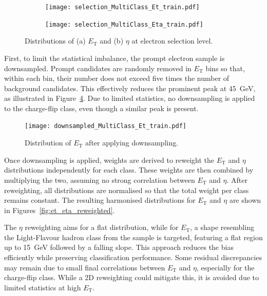 \begin{figure}[htbp]
  \centering
  \begin{subfigure}[b]{0.49\textwidth}
      \centering
      \texttt{[image: selection\_MultiClass\_Et\_train.pdf]}
      \caption{}
      \label{fig:et_selection}
  \end{subfigure}
  \hfill
  \begin{subfigure}[b]{0.49\textwidth}
      \centering
      \texttt{[image: selection\_MultiClass\_Eta\_train.pdf]}
      \caption{}
      \label{fig:eta_selection}
  \end{subfigure}
  \caption{Distributions of (a) $E_{\text{T}}$ and (b) $\eta$ at electron selection level.}
  \label{fig:et_eta_selection}
\end{figure}

First, to limit the statistical imbalance, the prompt electron sample is downsampled. Prompt candidates are randomly removed in $E_{\text{T}}$ bins so that, within each bin, their number does not exceed five times the number of background candidates. This effectively reduces the prominent peak at 45~GeV, as illustrated in Figure~\ref{fig:et_downsampled}. Due to limited statistics, no downsampling is applied to the charge-flip class, even though a similar peak is present.

\begin{figure}[htbp]
  \centering
  \texttt{[image: downsampled\_MultiClass\_Et\_train.pdf]}
  \caption{Distribution of $E_{\text{T}}$ after applying downsampling.}
  \label{fig:et_downsampled}
\end{figure}

Once downsampling is applied, weights are derived to reweight the $E_{\text{T}}$ and $\eta$ distributions independently for each class. These weights are then combined by multiplying the two, assuming no strong correlation between $E_{\text{T}}$ and $\eta$. After reweighting, all distributions are normalised so that the total weight per class remains constant. The resulting harmonised distributions for $E_{\text{T}}$ and $\eta$ are shown in Figures~\ref{fig:et_eta_reweighted}.

The $\eta$ reweighting aims for a flat distribution, while for $E_{\text{T}}$, a shape resembling the Light-Flavour hadron class from the \ttbar sample is targeted, featuring a flat region up to 15~GeV followed by a falling slope. This approach reduces the bias efficiently while preserving classification performance. Some residual discrepancies may remain due to small final correlations between $E_{\text{T}}$ and $\eta$, especially for the charge-flip class. While a 2D reweighting could mitigate this, it is avoided due to limited statistics at high $E_{\text{T}}$.

